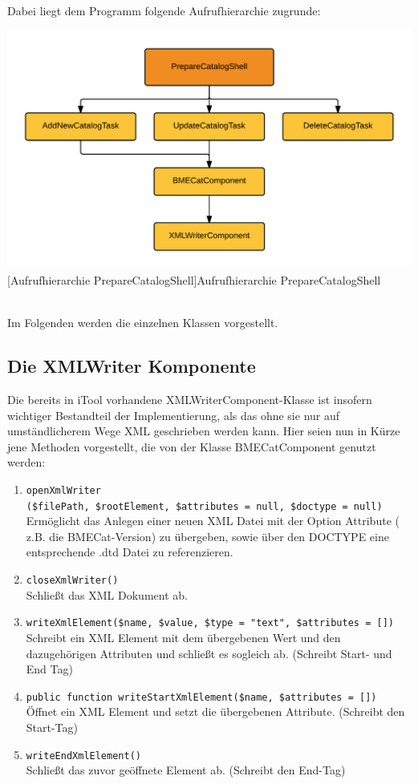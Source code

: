 	Dabei liegt dem Programm folgende Aufrufhierarchie zugrunde:\\
	\begin{minipage}{\linewidth}
		\vspace{1em}
		\centering
		\includegraphics[width=0.7 \linewidth]{img/Aufrufhierarchie}
		[Aufrufhierarchie PrepareCatalogShell]{Aufrufhierarchie PrepareCatalogShell}
		\vspace{1em}
	\end{minipage}\\
	
	
	
	
	Im Folgenden werden die einzelnen Klassen vorgestellt.
	
	\subsection{Die XMLWriter Komponente}
	
	Die bereits in iTool vorhandene XMLWriterComponent-Klasse ist insofern wichtiger Bestandteil der Implementierung, als das ohne sie nur auf umständlicherem Wege XML geschrieben werden kann. Hier seien nun in Kürze jene Methoden vorgestellt, die von der Klasse BMECatComponent genutzt werden:
	
	\begin{enumerate}[noitemsep]
	\item \texttt{openXmlWriter\\(\$filePath, \$rootElement, \$attributes = null, \$doctype = null)} \\
		  Ermöglicht das Anlegen einer neuen XML Datei mit der Option Attribute ( z.B. die BMECat-Version) zu übergeben, sowie über den DOCTYPE eine entsprechende .dtd Datei zu referenzieren.
	\item \texttt{closeXmlWriter()} \\
		  Schließt das XML Dokument ab.
	\item \texttt{writeXmlElement(\$name, \$value, \$type = "text", \$attributes = [])}\\
		  Schreibt ein XML Element mit dem übergebenen Wert und den dazugehörigen Attributen und schließt es sogleich ab. (Schreibt Start- und End Tag)
	\item \texttt{public function writeStartXmlElement(\$name, \$attributes = [])}\\
		  Öffnet ein XML Element und setzt die übergebenen Attribute. (Schreibt den Start-Tag)
	\item \texttt{writeEndXmlElement()}\\
		  Schließt das zuvor geöffnete Element ab. (Schreibt den End-Tag)
	\end{enumerate}
	
